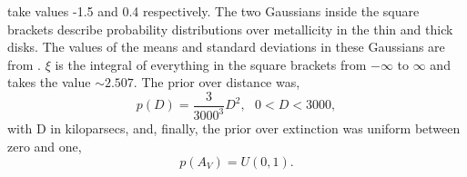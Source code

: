 take values -1.5 and 0.4 respectively.
The two Gaussians inside the square brackets describe probability
distributions over metallicity in the thin and thick disks.
The values of the means and standard deviations in these Gaussians are from
\citet{casagrande2011}.
$\xi$ is the integral of everything in the square brackets from $-\infty$ to
$\infty$ and takes the value $\sim 2.507$.
The prior over distance was,
\begin{equation}
    p(D) = \frac{3}{3000^3} D^2, ~~~ 0 < D < 3000,
\end{equation}
with D in kiloparsecs, and, finally, the prior over extinction was uniform
between zero and one,
\begin{equation}
    p(A_V) = U(0, 1).
\end{equation}
